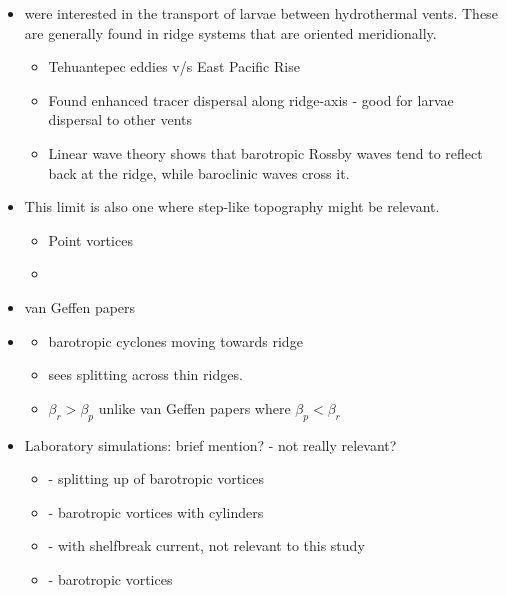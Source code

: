 \begin{itemize}
\item \citet{Adams2010} were interested in the transport of larvae between hydrothermal vents. These are generally found in ridge systems that are oriented meridionally.
\begin{itemize}
\item Tehuantepec eddies v/s East Pacific Rise
\item Found enhanced tracer dispersal along ridge-axis - good for larvae dispersal to other vents
\item Linear wave theory shows that barotropic Rossby waves tend to reflect back at the ridge, while baroclinic waves cross it.
\end{itemize}

\item This limit is also one where step-like topography might be relevant.
\begin{itemize}
\item Point vortices
\item \cite{Wang1992}
\end{itemize}
\item van Geffen papers
\item \citet{ZavalaSanson2002}
\begin{itemize}
\item barotropic cyclones moving towards ridge
\item sees splitting across thin ridges.
\item $β_r > β_p$ unlike van Geffen papers where $β_p < β_r$
\end{itemize}
\item Laboratory simulations: brief mention? - not really relevant?
\begin{itemize}
\item \citet{Adduce2004} - splitting up of barotropic vortices
\item \citet{Cenedese2002} - barotropic vortices with cylinders
\item \citet{Cenedese2013} - with shelfbreak current, not relevant to this study
\item \citep{Carnevale1988, Carnevale1991} - barotropic vortices
\end{itemize}
\end{itemize}

